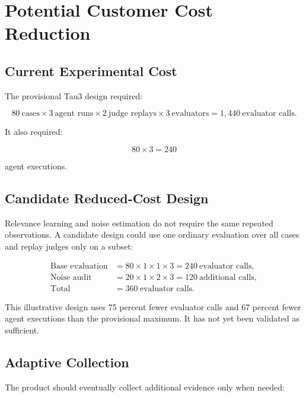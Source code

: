 \documentclass[11pt]{article}
\begin{document}
\section{Potential Customer Cost Reduction}

\subsection{Current Experimental Cost}

The provisional Tau3 design required:

\begin{equation}
80\ \text{cases}
\times 3\ \text{agent runs}
\times 2\ \text{judge replays}
\times 3\ \text{evaluators}
= 1{,}440\ \text{evaluator calls}.
\end{equation}

It also required:

\begin{equation}
80 \times 3 = 240
\end{equation}

agent executions.

\subsection{Candidate Reduced-Cost Design}

Relevance learning and noise estimation do not require the same repeated
observations. A candidate design could use one ordinary evaluation over all
cases and replay judges only on a subset:

\begin{align}
\text{Base evaluation}
&=
80 \times 1 \times 1 \times 3
= 240\ \text{evaluator calls}, \\
\text{Noise audit}
&=
20 \times 1 \times 2 \times 3
= 120\ \text{additional calls}, \\
\text{Total}
&=
360\ \text{evaluator calls}.
\end{align}

This illustrative design uses 75 percent fewer evaluator calls and 67 percent
fewer agent executions than the provisional maximum. It has not yet been
validated as sufficient.

\subsection{Adaptive Collection}

The product should eventually collect additional evidence only when needed:
\end{document}
